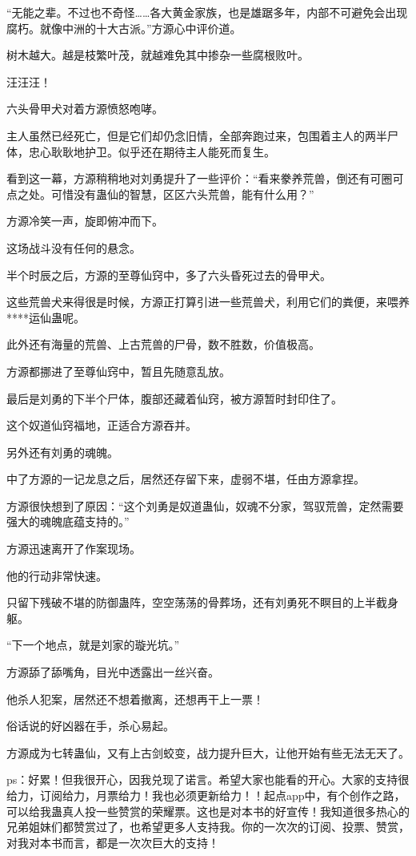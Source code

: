 \begin{this_body}
“无能之辈。不过也不奇怪……各大黄金家族，也是雄踞多年，内部不可避免会出现腐朽。就像中洲的十大古派。”方源心中评价道。

树木越大。越是枝繁叶茂，就越难免其中掺杂一些腐根败叶。

汪汪汪！

六头骨甲犬对着方源愤怒咆哮。

主人虽然已经死亡，但是它们却仍念旧情，全部奔跑过来，包围着主人的两半尸体，忠心耿耿地护卫。似乎还在期待主人能死而复生。

看到这一幕，方源稍稍地对刘勇提升了一些评价：“看来豢养荒兽，倒还有可圈可点之处。可惜没有蛊仙的智慧，区区六头荒兽，能有什么用？”

方源冷笑一声，旋即俯冲而下。

这场战斗没有任何的悬念。

半个时辰之后，方源的至尊仙窍中，多了六头昏死过去的骨甲犬。

这些荒兽犬来得很是时候，方源正打算引进一些荒兽犬，利用它们的粪便，来喂养****运仙蛊呢。

此外还有海量的荒兽、上古荒兽的尸骨，数不胜数，价值极高。

方源都挪进了至尊仙窍中，暂且先随意乱放。

最后是刘勇的下半个尸体，腹部还藏着仙窍，被方源暂时封印住了。

这个奴道仙窍福地，正适合方源吞并。

另外还有刘勇的魂魄。

中了方源的一记龙息之后，居然还存留下来，虚弱不堪，任由方源拿捏。

方源很快想到了原因：“这个刘勇是奴道蛊仙，奴魂不分家，驾驭荒兽，定然需要强大的魂魄底蕴支持的。”

方源迅速离开了作案现场。

他的行动非常快速。

只留下残破不堪的防御蛊阵，空空荡荡的骨葬场，还有刘勇死不瞑目的上半截身躯。

“下一个地点，就是刘家的璇光坑。”

方源舔了舔嘴角，目光中透露出一丝兴奋。

他杀人犯案，居然还不想着撤离，还想再干上一票！

俗话说的好凶器在手，杀心易起。

方源成为七转蛊仙，又有上古剑蛟变，战力提升巨大，让他开始有些无法无天了。

ps：好累！但我很开心，因我兑现了诺言。希望大家也能看的开心。大家的支持很给力，订阅给力，月票给力！我也必须更新给力！！起点app中，有个创作之路，可以给我蛊真人投一些赞赏的荣耀票。这也是对本书的好宣传！我知道很多热心的兄弟姐妹们都赞赏过了，也希望更多人支持我。你的一次次的订阅、投票、赞赏，对我对本书而言，都是一次次巨大的支持！

\end{this_body}

